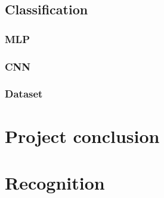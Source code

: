 \documentclass[11pt,a4paper,UKenglish]{article}
\begin{document}
\subsection{Classification}

\subsubsection{MLP}
\subsubsection{CNN}
\subsubsection{Dataset}


\section{Project conclusion}
\label{sec:Project conclusion}

\section{Recognition}
\label{sec:Recognition}




\end{document}
